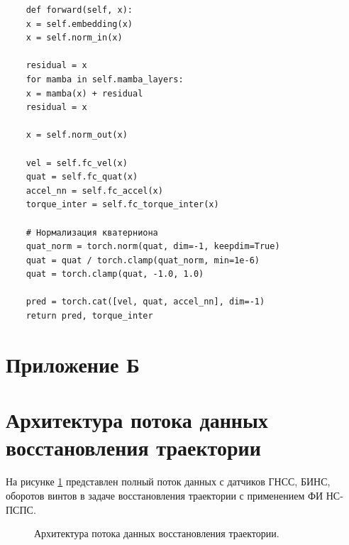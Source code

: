 \begin{lstlisting}
	def forward(self, x):
	x = self.embedding(x)
	x = self.norm_in(x)
	
	residual = x
	for mamba in self.mamba_layers:
	x = mamba(x) + residual
	residual = x
	
	x = self.norm_out(x)
	
	vel = self.fc_vel(x)
	quat = self.fc_quat(x)
	accel_nn = self.fc_accel(x)
	torque_inter = self.fc_torque_inter(x)
	
	# Нормализация кватерниона
	quat_norm = torch.norm(quat, dim=-1, keepdim=True)
	quat = quat / torch.clamp(quat_norm, min=1e-6)
	quat = torch.clamp(quat, -1.0, 1.0)
	
	pred = torch.cat([vel, quat, accel_nn], dim=-1)
	return pred, torque_inter
\end{lstlisting}

\section*{Приложение Б}

\section{Архитектура потока данных восстановления траектории}

На рисунке \ref{fig:data_flow} представлен полный поток данных с датчиков ГНСС, БИНС, оборотов винтов
в задаче восстановления траектории с применением ФИ НС-ПСПС. 
\begin{figure}[htbp]
	\centering
	\resizebox{0.92\linewidth}{!}{}
	\caption{Архитектура потока данных восстановления траектории.}
	\label{fig:data_flow}
\end{figure}
